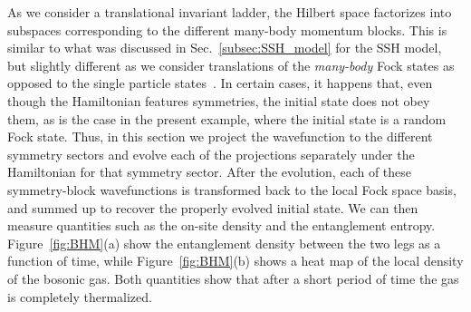 \documentclass{SciPost}
\newcommand\0{\scalebox{-1}[1]{0}}
\begin{document}
As we consider a translational invariant ladder, the Hilbert space factorizes into subspaces corresponding to the different many-body momentum blocks. This is similar to what was discussed in Sec.~\ref{subsec:SSH_model} for the SSH model, but slightly different as we consider translations of the \emph{many-body} Fock states as opposed to the single particle states~\cite{anders10}. In certain cases, it happens that, even though the Hamiltonian features symmetries, the initial state does not obey them, as is the case in the present example, where the initial state is a random Fock state. Thus, in this section we project the wavefunction to the different symmetry sectors and evolve each of the projections separately under the Hamiltonian for that symmetry sector. After the evolution, each of these symmetry-block wavefunctions is transformed back to the local Fock space basis, and summed up to recover the properly evolved initial state. We can then measure quantities such as the on-site density and the entanglement entropy. Figure~\ref{fig:BHM}(a) show the entanglement density between the two legs as a function of time, while Figure~\ref{fig:BHM}(b) shows a heat map of the local density of the bosonic gas. Both quantities show that after a short period of time the gas is completely thermalized. 
\end{document}
